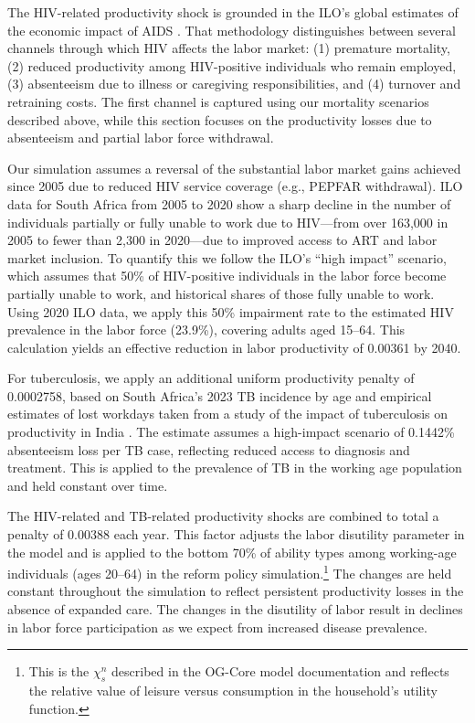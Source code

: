 \documentclass[letterpaper,12pt]{article}
\theoremstyle{definition}
\begin{document}
\begin{spacing}{1.5}
The HIV-related productivity shock is grounded in the ILO's global estimates of the economic impact of AIDS \citep{ILO2018}. That methodology distinguishes between several channels through which HIV affects the labor market: (1) premature mortality, (2) reduced productivity among HIV-positive individuals who remain employed, (3) absenteeism due to illness or caregiving responsibilities, and (4) turnover and retraining costs. The first channel is captured using our mortality scenarios described above, while this section focuses on the productivity losses due to absenteeism and partial labor force withdrawal.

Our simulation assumes a reversal of the substantial labor market gains achieved since 2005 due to reduced HIV service coverage (e.g., PEPFAR withdrawal). ILO data for South Africa from 2005 to 2020 show a sharp decline in the number of individuals partially or fully unable to work due to HIV—from over 163,000 in 2005 to fewer than 2,300 in 2020—due to improved access to ART and labor market inclusion. To quantify this we follow the ILO's ``high impact'' scenario, which assumes that 50\% of HIV-positive individuals in the labor force become partially unable to work, and historical shares of those fully unable to work. Using 2020 ILO data, we apply this 50\% impairment rate to the estimated HIV prevalence in the labor force (23.9\%), covering adults aged 15–64. This calculation yields an effective reduction in labor productivity of 0.00361 by 2040.

For tuberculosis, we apply an additional uniform productivity penalty of 0.0002758, based on South Africa's 2023 TB incidence by age and empirical estimates of lost workdays taken from a study of the impact of tuberculosis on productivity in India \citep{Keogh2024}. The estimate assumes a high-impact scenario of 0.1442\% absenteeism loss per TB case, reflecting reduced access to diagnosis and treatment. This is applied to the prevalence of TB in the working age population and held constant over time.

The HIV-related and TB-related productivity shocks are combined to total a penalty of 0.00388 each year. This factor adjusts the labor disutility parameter in the model and is applied to the bottom 70\% of ability types among working-age individuals (ages 20–64) in the reform policy simulation.\footnote{This is the $\chi^n_s$ described in the OG-Core model documentation and reflects the relative value of leisure versus consumption in the household's utility function.} The changes are held constant throughout the simulation to reflect persistent productivity losses in the absence of expanded care.  The changes in the disutility of labor result in declines in labor force participation as we expect from increased disease prevalence.


\end{spacing}
\end{document}
